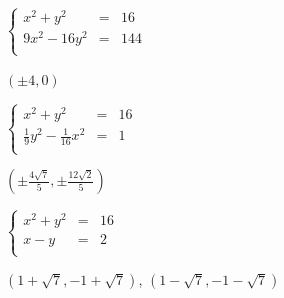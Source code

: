 \documentclass{ximera}
\begin{document}
\begin{question}
\begin{problem}
$\left\{\begin{array}{rcr}  x^2+y^2 & = & 16 \\ 9x^{2} - 16y^{2} & = & 144 \\ \end{array} \right.$   

\begin{solution}
    $(\pm 4,0)$
\end{solution}
\end{problem}

\begin{problem}
$\left\{\begin{array}{rcr}  x^2+y^2 & = & 16 \\ \frac{1}{9} y^2 - \frac{1}{16} x^2& = & 1 \\ \end{array} \right.$

\begin{solution}
    $\left(\pm \frac{4 \sqrt{7}}{5}, \pm \frac{12 \sqrt{2}}{5}  \right)$
\end{solution}
\end{problem}

\begin{problem}\label{solvenonlin1last}
$\left\{\begin{array}{rcr}  x^{2} + y^{2} & = & 16 \\ x-y & = & 2 \\ \end{array} \right.$ 

\begin{solution}
     $\left( 1 + \sqrt{7}, -1 + \sqrt{7}  \right)$, $\left( 1 - \sqrt{7}, -1 - \sqrt{7}  \right)$
\end{solution}
\end{problem}

\end{question}
\end{document}
